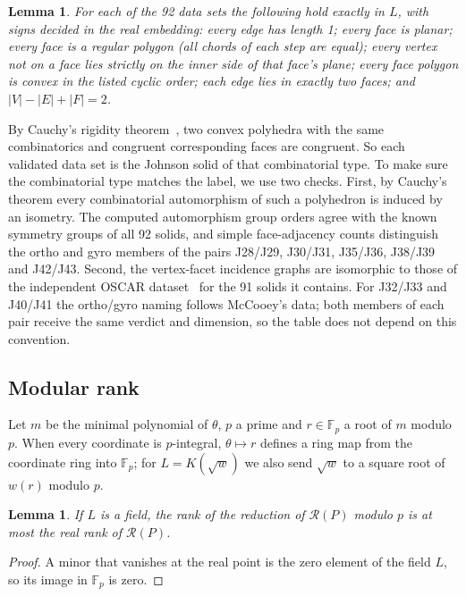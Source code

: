 \documentclass[11pt]{amsart}
\newtheorem{lemma}[theorem]{Lemma}
\theoremstyle{remark}
\newcommand{\F}{\mathbb F}
\newcommand{\RR}{\mathcal R}
\begin{document}
\begin{lemma}\label{lem:valid}
For each of the 92 data sets the following hold exactly in $L$, with signs decided in the real embedding: every edge has length 1; every face is planar; every face is a regular polygon (all chords of each step are equal); every vertex not on a face lies strictly on the inner side of that face's plane; every face polygon is convex in the listed cyclic order; each edge lies in exactly two faces; and $|V|-|E|+|F|=2$.
\end{lemma}

By Cauchy's rigidity theorem~\cite{Cauchy1813}, two convex polyhedra with the same combinatorics and congruent corresponding faces are congruent. So each validated data set is the Johnson solid of that combinatorial type. To make sure the combinatorial type matches the label, we use two checks. First, by Cauchy's theorem every combinatorial automorphism of such a polyhedron is induced by an isometry. The computed automorphism group orders agree with the known symmetry groups of all 92 solids, and simple face-adjacency counts distinguish the ortho and gyro members of the pairs J28/J29, J30/J31, J35/J36, J38/J39 and J42/J43. Second, the vertex-facet incidence graphs are isomorphic to those of the independent OSCAR dataset~\cite{OSCARJohnson} for the 91 solids it contains. For J32/J33 and J40/J41 the ortho/gyro naming follows McCooey's data; both members of each pair receive the same verdict and dimension, so the table does not depend on this convention.

\subsection{Modular rank}
Let $m$ be the minimal polynomial of $\theta$, $p$ a prime and $r\in\F_p$ a root of $m$ modulo $p$. When every coordinate is $p$-integral, $\theta\mapsto r$ defines a ring map from the coordinate ring into $\F_p$; for $L=K(\sqrt w)$ we also send $\sqrt w$ to a square root of $w(r)$ modulo $p$.

\begin{lemma}\label{lem:modp}
If $L$ is a field, the rank of the reduction of $\RR(P)$ modulo $p$ is at most the real rank of $\RR(P)$.
\end{lemma}

\begin{proof}
A minor that vanishes at the real point is the zero element of the field $L$, so its image in $\F_p$ is zero.
\end{proof}
\end{document}
